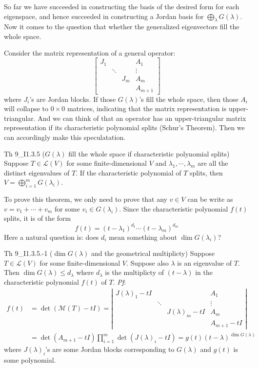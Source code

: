 \documentclass{article}
\begin{document}
So far we have succeeded in constructing the basis of the desired form for each eigenspace, and hence succeeded in constructing a Jordan basis for $\bigoplus_{\lambda} G(\lambda)$. Now it comes to the question that whether the generalized eigenvectors fill the whole space.

Consider the matrix representation of a general operator:
$$
\begin{bmatrix}
    J_1 & & & A_1 \\
     & \ddots & & \vdots \\
     & & J_m & A_m \\
     & & & A_{m+1}
\end{bmatrix}
$$
where $J_i$'s are Jordan blocks. If those $G(\lambda)$'s fill the whole space, then those $A_i$ will collapse to $0\times 0$ matrices, indicating that the matrix representation is upper-triangular. And we can think of that an operator has an upper-triangular matrix representation if its characteristic polynomial splits (Schur's Theorem). Then we can accordingly make this speculatation.

\begin{Th}{Th 9\_I1.3.5 ($G(\lambda)$ fill the whole space if characteristic polynomial splits)}
    Suppose $T\in\mathcal{L}(V)$ for some finite-dimensional $V$ and $\lambda_1, \cdots, \lambda_m$ are all the distinct eigenvalues of $T$. If the characteristic polynomial of $T$ splits, then $V = \bigoplus_{i=1}^m G(\lambda_i)$.
\end{Th}

To prove this theorem, we only need to prove that any $v\in V$ can be write as $v=v_1+\cdots+v_m$ for some $v_i\in G(\lambda_i)$. Since the characteristic polynomial $f(t)$ splits, it is of the form 
    $$f(t) = (t-\lambda_1)^{d_1}\cdots (t-\lambda_m)^{d_m}$$
Here a natural question is: does $d_i$ mean something about $\dim G(\lambda_i)$?

\begin{Th}{Th 9\_I1.3.5.-1 ($\dim G(\lambda)$ and the geometrical multiplicty)}
    Suppose $T\in\mathcal{L}(V)$ for some finite-dimensional $V$. Suppose also $\lambda$ is an eigenvalue of $T$. Then $\dim G(\lambda) \leq d_\lambda$ where $d_\lambda$ is the multiplicty of $(t-\lambda)$ in the characteristic polynomial $f(t)$ of $T$.
    \tcblower
    \textit{Pf}: 
    $$
    \begin{aligned}
        f(t) &= \det(\mathcal{M}(T)-t I) = 
        \left|\begin{array}{cccc}
            J(\lambda)_1-tI & & & A_1 \\
            & \ddots & & \vdots \\
            & & J(\lambda)_m-tI & A_m \\
            & & & A_{m+1}-tI
        \end{array}\right| \\
        &= \det(A_{m+1}-tI)\prod_{i=1}^{m}\det(J(\lambda)_i-tI) = g(t)(t-\lambda)^{\dim G(\lambda)}
    \end{aligned}
    $$
    where $J(\lambda)_i$'s are some Jordan blocks corresponding to $G(\lambda)$ and $g(t)$ is some polynomial.
\end{Th}
\end{document}
